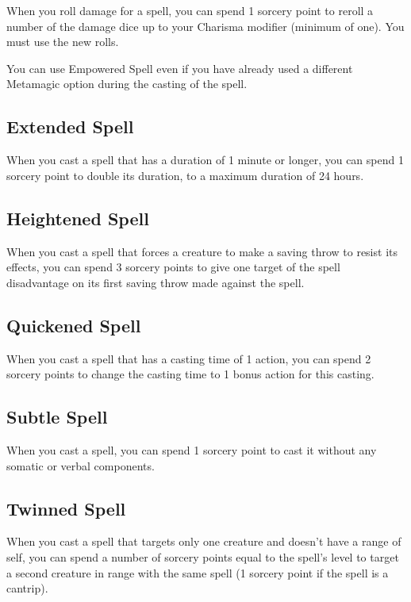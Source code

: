 When you roll damage for a spell, you can spend 1 sorcery point to reroll a number of the damage dice up to your Charisma modifier (minimum of one). You must use the new rolls.

You can use Empowered Spell even if you have already used a different Metamagic option during the casting of the spell.

\subsection{Extended Spell}

When you cast a spell that has a duration of 1 minute or longer, you can spend 1 sorcery point to double its duration, to a maximum duration of 24 hours.

\subsection{Heightened Spell}

When you cast a spell that forces a creature to make a saving throw to resist its effects, you can spend 3 sorcery points to give one target of the spell disadvantage on its first saving throw made against the spell.

\subsection{Quickened Spell}

When you cast a spell that has a casting time of 1 action, you can spend 2 sorcery points to change the casting time to 1 bonus action for this casting.

\subsection{Subtle Spell}

When you cast a spell, you can spend 1 sorcery point to cast it without any somatic or verbal components.

\subsection{Twinned Spell}

When you cast a spell that targets only one creature and doesn’t have a range of self, you can spend a number of sorcery points equal to the spell’s level to target a second creature in range with the same spell (1 sorcery point if the spell is a cantrip).

